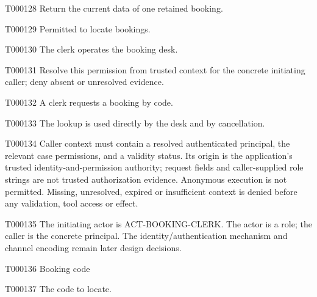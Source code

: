\documentclass[11pt,a4paper]{article}
\begin{document}
\begin{atlasparagraph}{T000128}
Return the current data of one retained booking.
\end{atlasparagraph}
\begin{atlastext}{T000129}
Permitted to locate bookings.
\end{atlastext}
\begin{atlasparagraph}{T000130}
The clerk operates the booking desk.
\end{atlasparagraph}
\begin{atlasparagraph}{T000131}
Resolve this permission from trusted context for the concrete initiating caller; deny absent or unresolved evidence.
\end{atlasparagraph}
\begin{atlasparagraph}{T000132}
A clerk requests a booking by code.
\end{atlasparagraph}
\begin{atlasparagraph}{T000133}
The lookup is used directly by the desk and by cancellation.
\end{atlasparagraph}
\begin{atlasparagraph}{T000134}
Caller context must contain a resolved authenticated principal, the relevant case permissions, and a validity status. Its origin is the application's trusted identity-and-permission authority; request fields and caller-supplied role strings are not trusted authorization evidence. Anonymous execution is not permitted. Missing, unresolved, expired or insufficient context is denied before any validation, tool access or effect.
\end{atlasparagraph}
\begin{atlasparagraph}{T000135}
The initiating actor is ACT-BOOKING-CLERK. The actor is a role; the caller is the concrete principal. The identity/authentication mechanism and channel encoding remain later design decisions.
\end{atlasparagraph}
\begin{atlastext}{T000136}
Booking code
\end{atlastext}
\begin{atlasparagraph}{T000137}
The code to locate.
\end{atlasparagraph}
\end{document}
